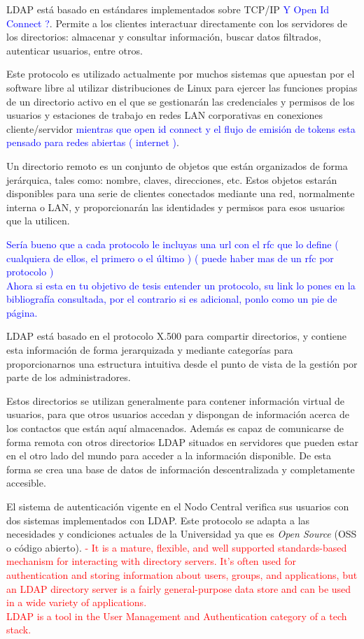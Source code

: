 LDAP está basado en estándares implementados sobre TCP/IP \textcolor{blue}{Y Open Id Connect ?}. Permite a los clientes interactuar directamente con los servidores de los directorios: almacenar y consultar información, buscar datos filtrados, autenticar usuarios, entre otros.

Este protocolo es utilizado actualmente por muchos sistemas que apuestan por el software libre al utilizar distribuciones de Linux para ejercer las funciones propias de un directorio activo en el que se gestionarán las credenciales y permisos de los usuarios y estaciones de trabajo en redes LAN corporativas en conexiones cliente/servidor \textcolor{blue}{mientras que open id connect y el flujo de emisión de tokens esta pensado para redes abiertas ( internet )}.

Un directorio remoto es un conjunto de objetos que están organizados de forma jerárquica, tales como: nombre, claves, direcciones, etc. Estos objetos estarán disponibles para una serie de clientes conectados mediante una red, normalmente interna o LAN, y proporcionarán las identidades y permisos para esos usuarios que la utilicen.

\textcolor{blue}{Sería bueno que a cada protocolo le incluyas una url con el rfc que lo define ( cualquiera de ellos, el primero o el último ) ( puede haber mas de un rfc por protocolo )
\\
Ahora si esta en tu objetivo de tesis entender un protocolo, su link lo pones en la bibliografía consultada, por el contrario si es adicional, ponlo como un pie de página.}

LDAP está basado en el protocolo X.500 para compartir directorios, y contiene esta información de forma jerarquizada y mediante categorías para proporcionarnos una estructura intuitiva desde el punto de vista de la gestión por parte de los administradores.

Estos directorios se utilizan generalmente para contener información virtual de usuarios, para que otros usuarios accedan y dispongan de información acerca de los contactos que están aquí almacenados. Además es capaz de comunicarse de forma remota con otros directorios LDAP situados en servidores que pueden estar en el otro lado del mundo para acceder a la información disponible. De esta forma se crea una base de datos de información descentralizada y completamente accesible.
 
El sistema de autenticación vigente en el Nodo Central verifica sus usuarios con dos sistemas implementados con LDAP. Este protocolo se adapta a las necesidades y condiciones actuales de la Universidad ya que es \textit{Open Source} (OSS o código abierto).
\textcolor{red}{
	- It is a mature, flexible, and well supported standards-based mechanism for interacting with directory servers. It’s often used for authentication and storing information about users, groups, and applications, but an LDAP directory server is a fairly general-purpose data store and can be used in a wide variety of applications. \\ LDAP is a tool in the User Management and Authentication category of a tech stack.}


